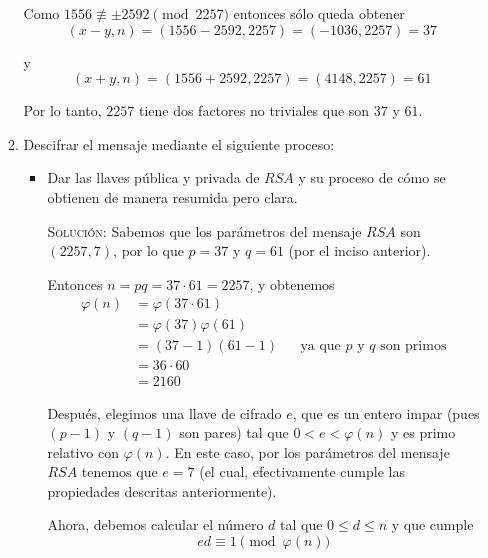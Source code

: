 \documentclass[letterpaper,11pt]{article}
\begin{document}
\begin{enumerate}
\begin{enumerate}
        Como $1556 \not \equiv \pm 2592 \pmod{2257}$ entonces sólo queda obtener
        \begin{equation*}
            (x - y, n) = (1556 - 2592, 2257)= (-1036, 2257) = 37
        \end{equation*}
        
        y
        \begin{equation*}
            (x + y, n) = (1556 + 2592, 2257)= (4148, 2257) = 61
        \end{equation*}
        
        Por lo tanto, $2257$ tiene dos factores no triviales que son $37$ y $61$. 
        
        \newpage
        \item Descifrar el mensaje mediante el siguiente proceso:
        \begin{itemize}
            \item Dar las llaves pública y privada de $RSA$ y su proceso de cómo
            se obtienen de manera resumida pero clara.
            
            \textsc{Solución:} Sabemos que los parámetros del mensaje $RSA$ son
            $(2257, 7)$, por lo que $p = 37$ y $q = 61$ (por el inciso anterior).
            
            Entonces $n = pq = 37 \cdot 61 = 2257$, y obtenemos 
            \begin{align*}
                \varphi(n) 
                &= \varphi(37 \cdot 61) \\ 
                &= \varphi(37) \varphi(61) \\
                &= (37 - 1) (61 - 1)
                && \text{ya que $p$ y $q$ son primos} \\
                &= 36 \cdot 60 \\
                &= 2160
            \end{align*}
            
            Después, elegimos una llave de cifrado $e$, que es un entero impar
            (pues $(p-1)$ y $(q-1)$ son pares) tal que $0 < e < \varphi(n)$ y 
            es primo relativo con $\varphi(n)$. En este caso, por los 
            parámetros del mensaje $RSA$ tenemos que $e = 7$ (el cual, 
            efectivamente cumple las propiedades descritas anteriormente).
            
            Ahora, debemos calcular el número $d$ tal que $0 \leq d \leq n$ y 
            que cumple
            \begin{equation*}
                ed \equiv 1 \pmod{\varphi(n)}
            \end{equation*}
            

\end{itemize}
\end{enumerate}
\end{enumerate}
\end{document}
